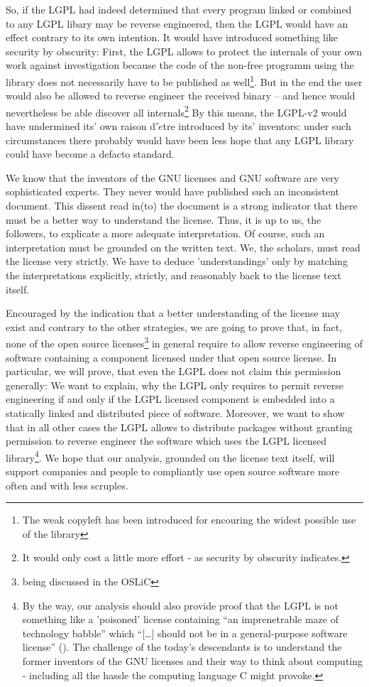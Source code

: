 So, if the LGPL had indeed determined that every program linked or combined to
any LGPL libary may be reverse engineered, then the LGPL would have an effect
contrary to its own intention. It would have introduced something like security
by obscurity: First, the LGPL allows to protect the internals of your own work
against investigation because the code of the non-free programm using the
library does not necessarily have to be published as well\footnote{The weak
copyleft has been introduced for encouring the widest possible use of the
library}. But in the end the user would also be allowed to reverse engineer the
received binary -- and hence would nevertheless be able discover all
internals\footnote{It would only cost a little more effort - as security by
obscurity indicates.} By this means, the LGPL-v2 would have undermined its' own
raison d'$\grave{e}$tre introduced by its' inventors: under such circumstances
there probably would have been less hope that any LGPL library could have become
a defacto standard.

We know that the inventors of the GNU licenses and GNU software are very
sophisticated experts. They never would have published such an inconsistent
document. This dissent read in(to) the document is a strong indicator that there
must be a better way to understand the license. Thus, it is up to us, the
followers, to explicate a more adequate interpretation. Of course, such an
interpretation must be grounded on the written text. We, the scholars, must read
the license very strictly. We have to deduce 'understandings' only by matching
the interpretations explicitly, strictly, and reasonably back to the license text
itself.

Encouraged by the indication that a better understanding of the license may
exist and contrary to the other strategies, we are going to prove that, in
fact, none of the open source licenses\footnote{being discussed in the OSLiC} in
general require to allow reverse engineering of software containing a component
licensed under that open source license. In particular, we will prove, that even
the LGPL does not claim this permission generally: We want to explain, why the
LGPL only requires to permit reverse engineering if and only if the LGPL
licensed component is embedded into a statically linked and distributed piece of
software. Moreover, we want to show that in all other cases the LGPL allows 
to distribute packages without granting permission to reverse engineer the
software which uses the LGPL licensed library\footnote{By the way, our analysis
should also provide proof that the LGPL is not something like a 'poisoned'
license containing \enquote{an imprenetrable maze of technology babble} which
\enquote{[\ldots] should not be in a general-purpose software license}
(\cite[cf.][124]{Rosen2005a}). The challenge of the today's descendants is to
understand the former inventors of the GNU licenses and their way to think about
computing - including all the hassle the computing language C might provoke.}.
We hope that our analysis, grounded on the license text itself, will support
companies and people to compliantly use open source software more often and with
less scruples.

